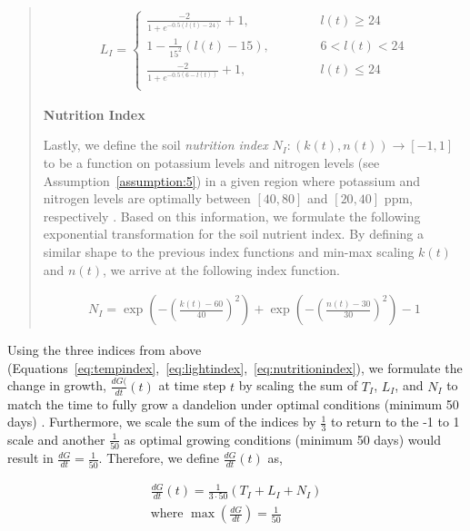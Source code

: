 \begin{quote}
\begin{align}
    L_I = 
    \begin{cases}
        \frac{-2}{1+e^{-0.5(l(t)-24)}} + 1, \hspace{2cm} & l(t) \geq 24 \\
        1 - \frac{1}{15^2} (l(t) - 15), & 6 < l(t) < 24 \\
        \frac{-2}{1+e^{-0.5(6-l(t))}} + 1, \hspace{2cm} & l(t) \leq 24 \\
    \end{cases}
    \label{eq:lightindex}
\end{align}

\textbf{Nutrition Index}

Lastly, we define the soil \textit{nutrition index} \(N_I: (k(t),n(t)) \longrightarrow [-1, 1]\) to be a function on potassium levels and nitrogen levels (see Assumption~\ref{assumption:5}) in a given region where potassium and nitrogen levels are optimally between \([40, 80]\) and \([20, 40]\) ppm, respectively \cite{arizona_guide_nodate}. Based on this information, we formulate the following exponential transformation for the soil nutrient index. By defining a similar shape to the previous index functions and min-max scaling \(k(t)\) and \(n(t)\), we arrive at the following index function.

\begin{align}
    N_I = \exp\left(-\left(\frac{k(t)-60}{40}\right)^2\right) + \exp\left(-\left(\frac{n(t)-30}{30}\right)^2\right) - 1
    \label{eq:nutritionindex}
\end{align}
\end{quote}


Using the three indices from above (Equations~\ref{eq:tempindex},~\ref{eq:lightindex},~\ref{eq:nutritionindex}), we formulate the change in growth, \(\frac{dG(}{dt}(t)\) at time step \(t\) by scaling the sum of \(T_I\), \(L_I\), and \(N_I\) to match the time to fully grow a dandelion under optimal conditions (minimum 50 days) \cite{gardeningknowhowDandelionHarvest}. Furthermore, we scale the sum of the indices by \(\frac{1}{3}\) to return to the -1 to 1 scale and another \(\frac{1}{50}\) as optimal growing conditions (minimum 50 days) would result in \(\frac{dG}{dt} = \frac{1}{50}\). Therefore, we define \(\frac{dG}{dt}(t)\) as,

\begin{align}
    \frac{dG}{dt}(t) = \frac{1}{3 \cdot 50}\left(T_I+L_I+N_I\right) \\
    \text{where } \max\left(\frac{dG}{dt}\right) = \frac{1}{50} \nonumber
\end{align}

